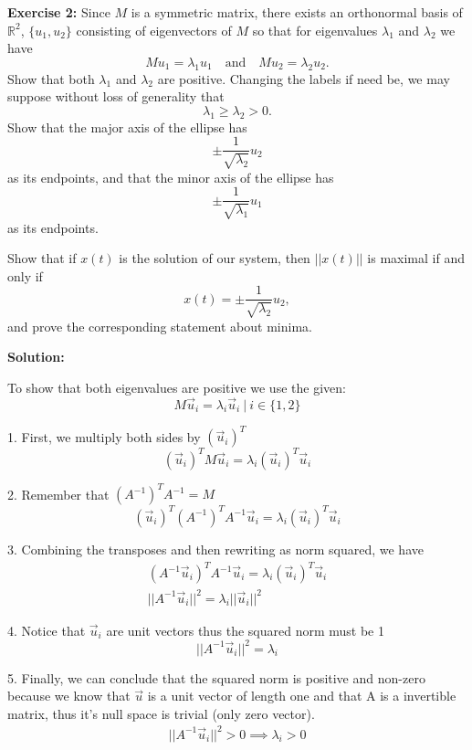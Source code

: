 \documentclass[12pt]{article}
\begin{document}
\vspace{1cm}


\noindent \textbf{Exercise 2:} Since $M$ is a symmetric matrix, there exists an orthonormal basis of $\mathbb{R}^{2}$, $\{u_{1},u_{2}\}$ consisting of eigenvectors of $M$ so that for eigenvalues $\lambda_{1}$ and $\lambda_{2}$ we have
\[
    Mu_{1}=\lambda_{1}u_{1} \quad \text{and} \quad Mu_{2}=\lambda_{2}u_{2}.
\]
Show that both $\lambda_{1}$ and $\lambda_{2}$ are positive. Changing the labels if need be, we may suppose without loss of generality that
\[
    \lambda_{1}\ge\lambda_{2}>0.
\]
Show that the major axis of the ellipse has
\[
    \pm \frac{1}{\sqrt{\lambda_2}}u_2
\]
as its endpoints, and that the minor axis of the ellipse has
\[
    \pm \frac{1}{\sqrt{\lambda_1}}u_1
\]
as its endpoints.

Show that if $x(t)$ is the solution of our system, then $||x(t)||$ is maximal if and only if
\[
    x(t)=\pm\frac{1}{\sqrt{\lambda_{2}}}u_{2} ,
\]
and prove the corresponding statement about minima.

\vspace{0.5cm}

\noindent{}\textbf{Solution:}

To show that both eigenvalues are positive we use the given:
\[
    M\vec{u}_i = \lambda{}_i\vec{u}_i ~|~ i \in{\{1, 2\}}
\]

1. First, we multiply both sides by $(\vec{u}_i)^T$
\[
    (\vec{u}_i)^TM\vec{u}_i = \lambda{}_i(\vec{u}_i)^T\vec{u}_i
\]

2. Remember that $(A^{-1})^TA^{-1}  = M$
\[
    (\vec{u}_i)^T(A^{-1})^TA^{-1}\vec{u}_i = \lambda{}_i(\vec{u}_i)^T\vec{u}_i
\]

3. Combining the transposes and then rewriting as norm squared, we have
\begin{align*}
    (A^{-1}\vec{u}_i)^TA^{-1}\vec{u}_i = \lambda{}_i(\vec{u}_i)^T\vec{u}_i \\
    ||A^{-1}\vec{u}_i||^2 =  \lambda{}_i ||\vec{u}_i||^2
\end{align*}

4. Notice that $\vec{u}_i$ are unit vectors thus the squared norm must be 1
\[
    ||A^{-1}\vec{u}_i||^2 =  \lambda{}_i
\]

5. Finally, we can conclude that the squared norm is positive and non-zero because we know that $\vec{u}$ is a unit vector of length one and that A is a invertible matrix, thus it's null space is trivial (only zero vector).
\begin{align*}
    ||A^{-1}\vec{u}_i||^2 >{0} \implies{\lambda{}_i >{0}}
\end{align*}
\end{document}
